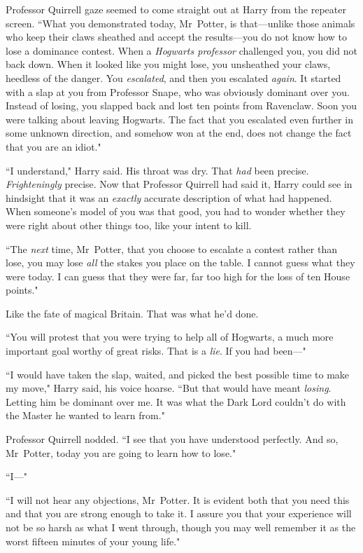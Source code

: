 Professor Quirrell gaze seemed to come straight out at Harry from the repeater screen. ``What you demonstrated today, Mr~Potter, is that—unlike those animals who keep their claws sheathed and accept the results—you do not know how to lose a dominance contest. When a \emph{Hogwarts professor} challenged you, you did not back down. When it looked like you might lose, you unsheathed your claws, heedless of the danger. You \emph{escalated}, and then you escalated \emph{again}. It started with a slap at you from Professor Snape, who was obviously dominant over you. Instead of losing, you slapped back and lost ten points from Ravenclaw. Soon you were talking about leaving Hogwarts. The fact that you escalated even further in some unknown direction, and somehow won at the end, does not change the fact that you are an idiot."

``I understand," Harry said. His throat was dry. That \emph{had} been precise. \emph{Frighteningly} precise. Now that Professor Quirrell had said it, Harry could see in hindsight that it was an \emph{exactly} accurate description of what had happened. When someone's model of you was that good, you had to wonder whether they were right about other things too, like your intent to kill.

``The \emph{next} time, Mr~Potter, that you choose to escalate a contest rather than lose, you may lose \emph{all} the stakes you place on the table. I cannot guess what they were today. I can guess that they were far, far too high for the loss of ten House points."

Like the fate of magical Britain. That was what he'd done.

``You will protest that you were trying to help all of Hogwarts, a much more important goal worthy of great risks. That is a \emph{lie}. If you had been—"

``I would have taken the slap, waited, and picked the best possible time to make my move," Harry said, his voice hoarse. ``But that would have meant \emph{losing}. Letting him be dominant over me. It was what the Dark Lord couldn't do with the Master he wanted to learn from."

Professor Quirrell nodded. ``I see that you have understood perfectly. And so, Mr~Potter, today you are going to learn how to lose."

``I—"

``I will not hear any objections, Mr~Potter. It is evident both that you need this and that you are strong enough to take it. I assure you that your experience will not be so harsh as what I went through, though you may well remember it as the worst fifteen minutes of your young life."


